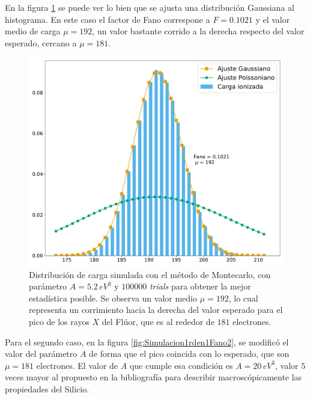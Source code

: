 \indent En la figura \ref{fig:Simulacion1rden1Fano1} se puede ver lo bien que se ajusta una distribución Gaussiana al histograma. En este caso el factor de Fano correspone a $F = 0.1021$ y el valor medio de carga $\mu = 192$, un valor bastante corrido a la derecha respecto del valor esperado, cercano a $\mu = 181$.
\begin{figure}[h]
    \centering
    \includegraphics[scale=0.35]{Figs/Fano_677_Eloss0_100ktrials.pdf}
    \caption{\footnotesize{Distribución de carga simulada con el método de Montecarlo, con parámetro $A = 5.2\,\si{eV}^{3}$ y $100000$ \textit{trials} para obtener la mejor estadística posible. Se observa un valor medio $\mu = 192$, lo cual representa un corrimiento hacia la derecha del valor esperado para el pico de los rayos $X$ del Flúor, que es al rededor de $181$ electrones.}}
    \label{fig:Simulacion1rden1Fano1}
\end{figure}
\noindent Para el segundo caso, en la figura \ref{fig:Simulacion1rden1Fano2}, se modificó el valor del parámetro $A$ de forma que el pico coincida con lo esperado, que son $\mu = 181$ electrones. El valor de $A$ que cumple esa condición es $A = 20\,\si{eV}^{3}$, valor $5$ veces mayor al propuesto en la bibliografía para describir macroscópicamente las propiedades del Silicio.
